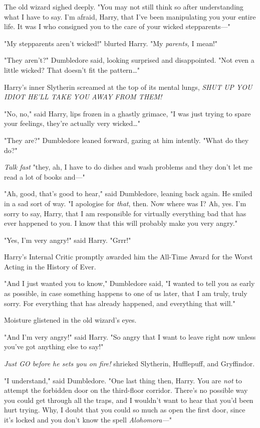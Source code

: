 The old wizard sighed deeply. "You may not still think so after understanding 
what I have to say. I'm afraid, Harry, that I've been manipulating you your 
entire life. It was I who consigned you to the care of your wicked 
stepparents---"

"My stepparents aren't wicked!" blurted Harry. "My \emph{parents,} I mean!"

"They aren't?" Dumbledore said, looking surprised and disappointed. "Not even a 
little wicked? That doesn't fit the pattern{\ldots}"

Harry's inner Slytherin screamed at the top of its mental lungs, \emph{SHUT UP 
YOU IDIOT HE'LL TAKE YOU AWAY FROM THEM!}

"No, no," said Harry, lips frozen in a ghastly grimace, "I was just trying to 
spare your feelings, they're actually very wicked{\ldots}"

"They are?" Dumbledore leaned forward, gazing at him intently. "What do they 
do?"

\emph{Talk fast} "they, ah, I have to do dishes and wash problems and they 
don't let me read a lot of books and---"

"Ah, good, that's good to hear," said Dumbledore, leaning back again. He smiled 
in a sad sort of way. "I apologise for \emph{that}, then. Now where was I? Ah, 
yes. I'm sorry to say, Harry, that I am responsible for virtually everything 
bad that has ever happened to you. I know that this will probably make you very 
angry."

"Yes, I'm very angry!" said Harry. "Grrr!"

Harry's Internal Critic promptly awarded him the All-Time Award for the Worst 
Acting in the History of Ever.

"And I just wanted you to know," Dumbledore said, "I wanted to tell you as 
early as possible, in case something happens to one of us later, that I am 
truly, truly sorry. For everything that has already happened, and everything 
that will."

Moisture glistened in the old wizard's eyes.

"And I'm very angry!" said Harry. "So angry that I want to leave right now 
unless you've got anything else to say!"

\emph{Just GO before he sets you on fire!} shrieked Slytherin, Hufflepuff, and 
Gryffindor.

"I understand," said Dumbledore. "One last thing then, Harry. You are 
\emph{not} to attempt the forbidden door on the third-floor corridor. There's 
no possible way you could get through all the traps, and I wouldn't want to 
hear that you'd been hurt trying. Why, I doubt that you could so much as open 
the first door, since it's locked and you don't know the spell 
\emph{Alohomora---}"

